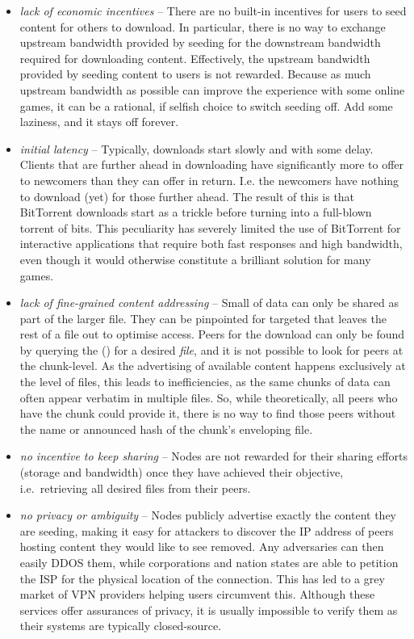 \begin{itemize}
\item \emph{lack of economic incentives} -- 
There are no built-in incentives for users to seed content for others to download. In particular, there is no way to exchange upstream bandwidth provided by seeding for the downstream bandwidth required for downloading content. Effectively, the upstream bandwidth provided by seeding content to users is not rewarded. Because as much upstream bandwidth as possible can improve the experience with some online games, it can be a rational, if selfish choice to switch seeding off. Add some laziness, and it stays off forever.

\item \emph{initial latency} -- 
 Typically, downloads start slowly and with some delay. Clients that are further ahead in downloading have significantly more to offer to newcomers than they can offer in return. I.e. the newcomers have nothing to download (yet) for those further ahead. The result of this is that BitTorrent downloads start as a trickle before turning into a full-blown torrent of bits. This peculiarity has severely limited the use of BitTorrent for interactive applications that require both fast responses and high bandwidth, even though it would otherwise constitute a brilliant solution for many games.
 
\item \emph{lack of fine-grained content addressing} -- Small  of data can only be shared as part of the larger file. They can be pinpointed for targeted that leaves the rest of a file out to optimise access. Peers for the download can only be found by querying the  () for a desired \emph{file}, and it is not possible to look for peers at the chunk-level. As the advertising of available content happens exclusively at the level of files, this leads to inefficiencies, as the same chunks of data can often appear verbatim in multiple files. So, while theoretically, all peers who have the chunk could provide it, there is no way to find those peers without the name or announced hash of the chunk's enveloping file.

\item \emph{no incentive to keep sharing} --
Nodes are not rewarded for their sharing efforts (storage and bandwidth) once they have achieved their objective, i.e.\ retrieving all desired files from their peers.

\item \emph{no privacy or ambiguity} --
Nodes publicly advertise exactly the content they are seeding, making it easy for attackers to discover the IP address of peers hosting content they would like to see removed. Any adversaries can then easily DDOS them, while corporations and nation states are able to petition the ISP for the physical location of the connection. This has led to a grey market of VPN providers helping users circumvent this. Although these services offer assurances of privacy, it is usually impossible to verify them as their systems are typically closed-source. 
\end{itemize}


